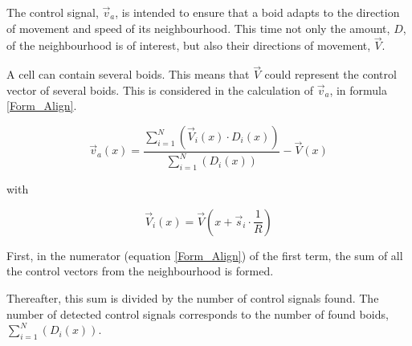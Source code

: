 \documentclass[a4paper, 10pt, journal]{wissarbIEEE}      %
\begin{document}

The control signal, $\vec{v}_a$, is intended to ensure that a boid adapts to the direction of movement and speed of its neighbourhood. This time not only the amount, $D$, of the neighbourhood is of interest, but also their directions of movement, $\vec{V}$. 




 

A cell can contain several boids. This means that $\vec{V}$ could represent the control vector of several boids. This is considered in the calculation of $\vec{v}_a$, in formula \ref{Form_Align}.


\begin{equation}
\vec{v}_a(x) = \dfrac{\sum_{i=1}^N(\vec{V}_i(x) \cdot D_i(x))}{\sum_{i=1}^N(D_i(x))} - \vec{V}(x)
\label{Form_Align}
\end{equation}

with

\begin{equation}
\vec{V}_i(x) = \vec{V}(x + \vec{s}_i \cdot \dfrac{1}{R})
\label{Form_Vi}
\end{equation}


First, in the numerator (equation \ref{Form_Align}) of the first term, the sum of all the control vectors from the neighbourhood is formed. 


Thereafter, this sum is divided by the number of control signals found. The number of detected control signals corresponds to the number of found boids, $\sum_{i=1}^N(D_i(x))$.
\end{document}
